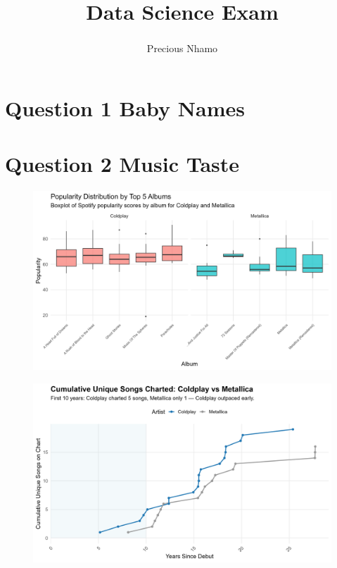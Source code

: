\documentclass[
  man,floatsintext]{apa6}
\title{Data Science Exam}
\author{Precious Nhamo\textsuperscript{}}
\date{}
\affiliation{\phantom{0}}
\begin{document}
\maketitle

\section{Question 1 Baby Names}\label{question-1-baby-names}

\section{Question 2 Music Taste}\label{question-2-music-taste}

\begin{figure}

{\centering \includegraphics[width=0.9\linewidth]{../Question2/Results/popalbums} 

}

\caption{ }\label{fig:include-image-1}
\end{figure}
\begin{figure}

{\centering \includegraphics[width=0.9\linewidth]{../Question2/Results/uniquesongs} 

}

\caption{ }\label{fig:include-image-2}
\end{figure}
\end{document}
